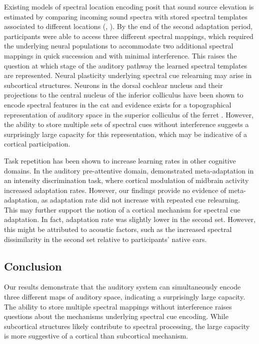 \documentclass[preprint]{JASA}
\begin{document}
Existing models of spectral location encoding posit that sound source elevation is estimated by comparing incoming sound spectra with stored spectral templates associated to different locations (\citet{hofman_spectro-temporal_1998}, \citet{langendijk_contribution_2002}). By the end of the second adaptation period, participants were able to access three different spectral mappings, which required the underlying neural populations to accommodate two additional spectral mappings in quick succession and with minimal interference. This raises the question at which stage of the auditory pathway the learned spectral templates are represented. Neural plasticity underlying spectral cue relearning may arise in subcortical structures. Neurons in the dorsal cochlear nucleus and their projections to the central nucleus of the inferior colliculus have been shown to encode spectral features in the cat \citep{davis_auditory_2003} and evidence exists for a topographical representation of auditory space in the superior colliculus of the ferret \citep{king_spatial_1987}. However, the ability to store multiple sets of spectral cues without interference suggests a surprisingly large capacity for this representation, which may be indicative of a cortical participation. 

Task repetition has been shown to increase learning rates in other cognitive domains. In the auditory pre-attentive domain, \citet{robinson_meta-adaptation_2016} demonstrated meta-adaptation in an intensity discrimination task, where cortical modulation of midbrain activity increased adaptation rates. However, our findings provide no evidence of meta-adaptation, as adaptation rate did not increase with repeated cue relearning. This may further support the notion of a cortical mechanism for spectral cue adaptation. In fact, adaptation rate was slightly lower in the second set. However, this might be attributed to acoustic factors, such as the increased spectral dissimilarity in the second set relative to participants’ native ears.

\subsection{Conclusion} 
Our results demonstrate that the auditory system can simultaneously encode three different maps of auditory space, indicating a surprisingly large capacity. The ability to store multiple spectral mappings without interference raises questions about the mechanisms underlying spectral cue encoding. While subcortical structures likely contribute to spectral processing, the large capacity is more suggestive of a cortical than subcortical mechanism. 




\end{document}
